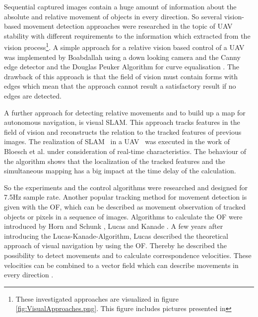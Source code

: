 Sequential captured images contain a huge amount of information about the
absolute and relative movement of objects in every direction.
\newpage
So several vision-based movement detection approaches were researched in the topic of \gls{UAV}~
stability with different requirements to the information which extracted from the
vision process\footnote{These investigated approaches are visualized in figure
\ref{fig:VisualApproaches.png}. This figure includes pictures presented in
}.
A simple approach for a relative vision
based control of a \gls{UAV}~ was implemented by Boabdallah  using a down looking camera and the Canny edge detector  and the Douglas Peuker Algorithm for curve equalisation . The drawback
of this approach is that the field of vision must contain forms with edges which
mean that the approach cannot result a satisfactory result if no edges are
detected. 

A further approach for detecting relative movements and to build up a
map for autonomous navigation, is visual \gls{SLAM}. This approach tracks features in
the field of vision and reconstructs the relation to the tracked features of previous
images. The realization of \gls{SLAM}~  in a \gls{UAV}~ was executed
in the work of Bloesch et al.  under consideration of
real-time characteristics. The behaviour of the algorithm shows that the
localization of the tracked features and the simultaneous mapping has a big
impact at the time delay of the calculation.

So the experiments and the control
algorithms were researched and designed for 7.5Hz sample rate. Another popular
tracking method for movement detection is given with the \gls{OF}, which can
be described as movement observation of tracked objects or pixels in a sequence
of images. Algorithms to calculate the \gls{OF} were introduced by Horn and
Schunk , Lucas and Kanade . A few
years after introducing the Lucas-Kanade-Algorithm, Lucas described the
theoretical approach of visual navigation by using the \gls{OF}. Thereby he
described the possibility to detect movements and to calculate correspondence
velocities.
\newpage
These velocities can be combined to a vector field which can describe
movements in every direction .

